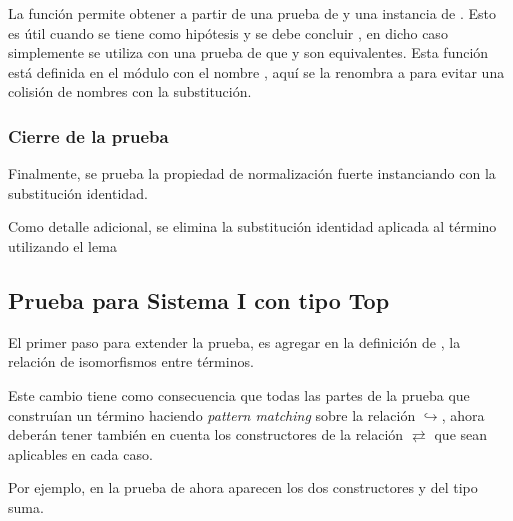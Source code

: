 La función  permite obtener  a partir de una prueba de  \type{$\cong$}  y una instancia de .
Esto es útil cuando se tiene como hipótesis \snstar {} y se debe concluir \snstar {}, en dicho caso simplemente se utiliza  con una prueba de que  y  son equivalentes.
Esta función está definida en el módulo  con el nombre , aquí se la renombra a  para evitar una colisión de nombres con la substitución.

\subsubsection{Cierre de la prueba}

Finalmente, se prueba la propiedad de normalización fuerte instanciando  con la substitución identidad.

Como detalle adicional, se elimina la substitución identidad aplicada al término utilizando el lema
\AgdaSymbol{:}
\AgdaSymbol{\}}
\AgdaSymbol{\{}
\AgdaSymbol{:}
\AgdaSymbol{\}}



\subsection{Prueba para Sistema I con tipo Top}

El primer paso para extender la prueba, es agregar en la definición de , la relación de isomorfismos entre términos.


Este cambio tiene como consecuencia que todas las partes de la prueba que construían un término \snstar haciendo \textit{pattern matching} sobre la relación $\hookrightarrow$, ahora deberán tener también en cuenta los constructores de la relación $\rightleftarrows$ que sean aplicables en cada caso.

Por ejemplo, en la prueba de  ahora aparecen los dos constructores  y  del tipo suma.


